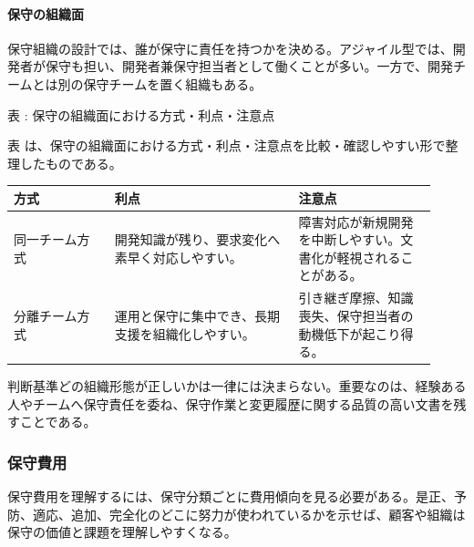 \paragraph{保守の組織面}
保守組織の設計では、誰が保守に責任を持つかを決める。アジャイル型では、開発者が保守も担い、開発者兼保守担当者として働くことが多い。一方で、開発チームとは別の保守チームを置く組織もある。\par
\par\smallskip\noindent{}\label{tab:ch07-06}表 \thetable: 保守の組織面における方式・利点・注意点\par\smallskip
表 \thetable は、保守の組織面における方式・利点・注意点を比較・確認しやすい形で整理したものである。\par\smallskip
\begin{longtable}{p{0.22\linewidth}p{0.40\linewidth}p{0.30\linewidth}}
\toprule
方式 & 利点 & 注意点 \\
\midrule
\endhead
同一チーム方式 & 開発知識が残り、要求変化へ素早く対応しやすい。 & 障害対応が新規開発を中断しやすい。文書化が軽視されることがある。 \\
分離チーム方式 & 運用と保守に集中でき、長期支援を組織化しやすい。 & 引き継ぎ摩擦、知識喪失、保守担当者の動機低下が起こり得る。 \\
\bottomrule
\end{longtable}
\begin{pointbox}{判断基準}どの組織形態が正しいかは一律には決まらない。重要なのは、経験ある人やチームへ保守責任を委ね、保守作業と変更履歴に関する品質の高い文書を残すことである。\end{pointbox}
\subsubsection{保守費用}
保守費用を理解するには、保守分類ごとに費用傾向を見る必要がある。是正、予防、適応、追加、完全化のどこに努力が使われているかを示せば、顧客や組織は保守の価値と課題を理解しやすくなる。\par
